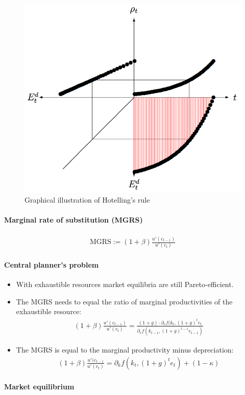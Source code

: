 \documentclass[a4paper,landscape,7pt,fleqn]{scrartcl}
\begin{document}
\begin{multicols*}{3}
\begin{figure}[H]
\centering
\includegraphics[width=0.5 \linewidth]{hotelling}
\caption{Graphical illustration of Hotelling's rule}
\end{figure}

\paragraph{Marginal rate of substitution (MGRS)}

\begin{align*}
\text{MGRS} := (1+\beta) \frac{u'(c_{t-1})}{u'(c_t)}
\end{align*}

\paragraph{Central planner's problem}

\begin{itemize}
\item With exhaustible resources market equilibria are still Pareto-efficient.
\item The MGRS needs to equal the ratio of marginal productivities of the exhaustible resource:
\begin{align*}
(1+\beta) \frac{u'(c_{t-1})}{u'(c_t)} = \frac{(1+g) \cdot  \partial_e f(k_t,(1+g)^t e_t}{\partial_e f(k_{t-1},(1+g)^{t-1} e_{t-1})}
\end{align*}
\item The MGRS is equal to the marginal productivity minus depreciation:
\begin{align*}
(1+\beta) \frac{u'(c_{t-1}}{u'(c_t)} = \partial_k f(k_t,(1+g)^t e_t) + (1-\kappa)
\end{align*}
\end{itemize}

\paragraph{Market equilibrium}


\end{multicols*}
\end{document}
